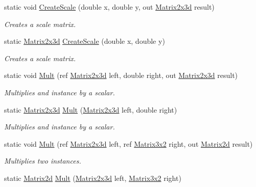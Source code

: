 \begin{DoxyCompactItemize}
static void \hyperlink{struct_open_t_k_1_1_matrix2x3d_a44de499fb78b9bebaa0e0a494123a252}{Create\-Scale} (double x, double y, out \hyperlink{struct_open_t_k_1_1_matrix2x3d}{Matrix2x3d} result)
\begin{DoxyCompactList}\small\item\em Creates a scale matrix. \end{DoxyCompactList}\item 
static \hyperlink{struct_open_t_k_1_1_matrix2x3d}{Matrix2x3d} \hyperlink{struct_open_t_k_1_1_matrix2x3d_ae8f56e1e2dafde027a26fb1db7309471}{Create\-Scale} (double x, double y)
\begin{DoxyCompactList}\small\item\em Creates a scale matrix. \end{DoxyCompactList}\item 
static void \hyperlink{struct_open_t_k_1_1_matrix2x3d_aa1e651c4870c5475bcc8e9a86d472d13}{Mult} (ref \hyperlink{struct_open_t_k_1_1_matrix2x3d}{Matrix2x3d} left, double right, out \hyperlink{struct_open_t_k_1_1_matrix2x3d}{Matrix2x3d} result)
\begin{DoxyCompactList}\small\item\em Multiplies and instance by a scalar. \end{DoxyCompactList}\item 
static \hyperlink{struct_open_t_k_1_1_matrix2x3d}{Matrix2x3d} \hyperlink{struct_open_t_k_1_1_matrix2x3d_ae173678e28a9f208d1e9c5cd9acaf089}{Mult} (\hyperlink{struct_open_t_k_1_1_matrix2x3d}{Matrix2x3d} left, double right)
\begin{DoxyCompactList}\small\item\em Multiplies and instance by a scalar. \end{DoxyCompactList}\item 
static void \hyperlink{struct_open_t_k_1_1_matrix2x3d_aa7f60c05884926c7b4b607a22a65f604}{Mult} (ref \hyperlink{struct_open_t_k_1_1_matrix2x3d}{Matrix2x3d} left, ref \hyperlink{struct_open_t_k_1_1_matrix3x2}{Matrix3x2} right, out \hyperlink{struct_open_t_k_1_1_matrix2d}{Matrix2d} result)
\begin{DoxyCompactList}\small\item\em Multiplies two instances. \end{DoxyCompactList}\item 
static \hyperlink{struct_open_t_k_1_1_matrix2d}{Matrix2d} \hyperlink{struct_open_t_k_1_1_matrix2x3d_abb3434c601335393b1f4d75618513009}{Mult} (\hyperlink{struct_open_t_k_1_1_matrix2x3d}{Matrix2x3d} left, \hyperlink{struct_open_t_k_1_1_matrix3x2}{Matrix3x2} right)

\end{DoxyCompactItemize}
